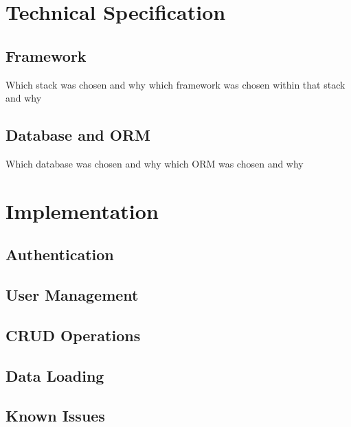 \documentclass[12pt, a4paper,twoside]{report}
\theoremstyle{plain} %
\theoremstyle{definition} %
\numberwithin{equation}{chapter}
\begin{document}

\chapter{Technical Specification}\label{ch:techspec}

\section{Framework}\label{sec:framework}

Which stack was chosen and why
which framework was chosen within that stack and why

\section{Database and ORM}\label{sec:databaseorm}

Which database was chosen and why
which ORM was chosen and why


\chapter{Implementation}\label{ch:implementation}

\section{Authentication}\label{sec:authentication}

\section{User Management}\label{sec:usermanagement}

\section{CRUD Operations}\label{sec:crudoperations}

\section{Data Loading}\label{sec:dataloading}

\section{Known Issues}\label{sec:knownissues}
\end{document}
